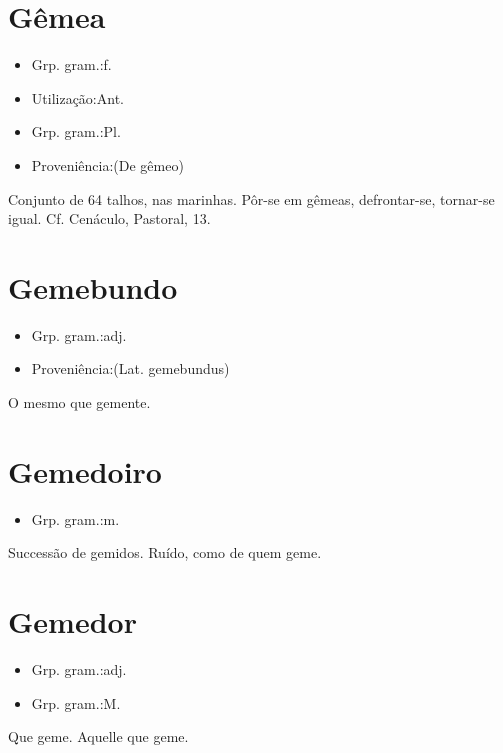 \section{Gêmea}
\begin{itemize}
\item {Grp. gram.:f.}
\end{itemize}
\begin{itemize}
\item {Utilização:Ant.}
\end{itemize}
\begin{itemize}
\item {Grp. gram.:Pl.}
\end{itemize}
\begin{itemize}
\item {Proveniência:(De \textunderscore gêmeo\textunderscore )}
\end{itemize}
Conjunto de 64 talhos, nas marinhas.
\textunderscore Pôr-se em gêmeas\textunderscore , defrontar-se, tornar-se igual. Cf. Cenáculo, \textunderscore Pastoral\textunderscore , 13.
\section{Gemebundo}
\begin{itemize}
\item {Grp. gram.:adj.}
\end{itemize}
\begin{itemize}
\item {Proveniência:(Lat. \textunderscore gemebundus\textunderscore )}
\end{itemize}
O mesmo que \textunderscore gemente\textunderscore .
\section{Gemedoiro}
\begin{itemize}
\item {Grp. gram.:m.}
\end{itemize}
Successão de gemidos.
Ruído, como de quem geme.
\section{Gemedor}
\begin{itemize}
\item {Grp. gram.:adj.}
\end{itemize}
\begin{itemize}
\item {Grp. gram.:M.}
\end{itemize}
Que geme.
Aquelle que geme.
